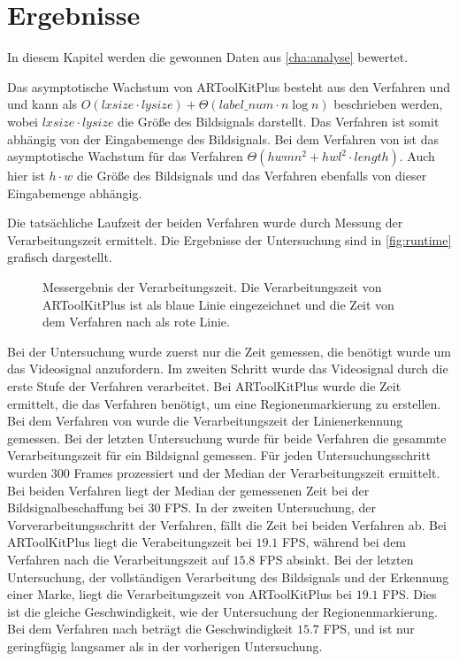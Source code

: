 \chapter{Ergebnisse} %
\label{cha:ergebnisse}
\begin{comment}
	Ergebnisse: Die gewonnen Daten aus Kap. Analyse bewerten.
\end{comment}

In diesem Kapitel werden die gewonnen Daten aus \autoref{cha:analyse} bewertet.

Das asymptotische Wachstum von ARToolKitPlus besteht aus den Verfahren  und
  und kann als $O(\mathit{lxsize}\cdot\mathit{lysize})
 + \Theta(\mathit{label\_num}\cdot n \log n)$ beschrieben werden, wobei $\mathit{lxsize}\cdot\mathit{lysize}$ die Größe
 des Bildsignals darstellt. Das Verfahren ist somit abhängig von der Eingabemenge des Bildsignals. Bei dem Verfahren von
 \citeauthor{hirzer08} ist das asymptotische Wachstum für das Verfahren 
 $\Theta(hwmn^2+hwl^2\cdot\mathit{length})$. Auch hier ist $h \cdot w$ die Größe des Bildsignals und das Verfahren
 ebenfalls von dieser Eingabemenge abhängig.

Die tatsächliche Laufzeit der beiden Verfahren wurde durch Messung der Verarbeitungszeit ermittelt. Die Ergebnisse der Untersuchung sind in \autoref{fig:runtime} grafisch dargestellt.
\begin{figure}[!ht]
	\centering
	
	\caption{Messergebnis der Verarbeitungszeit. Die Verarbeitungszeit von ARToolKitPlus ist als blaue Linie
	 eingezeichnet und die Zeit von dem Verfahren nach \citeauthor{hirzer08} als rote Linie.}
	\label{fig:runtime}
\end{figure}
 Bei der Untersuchung wurde zuerst nur die Zeit gemessen, die benötigt wurde um das Videosignal anzufordern. Im zweiten
 Schritt wurde das Videosignal durch die erste Stufe der Verfahren verarbeitet. Bei ARToolKitPlus wurde die Zeit
 ermittelt, die das Verfahren  benötigt, um eine Regionenmarkierung zu erstellen. Bei dem
 Verfahren von \citeauthor{hirzer08} wurde die Verarbeitungszeit der Linienerkennung gemessen. Bei der letzten
 Untersuchung wurde für beide Verfahren die gesammte Verarbeitungszeit für ein Bildsignal gemessen. Für jeden
 Untersuchungsschritt wurden $300$ Frames prozessiert und der Median der Verarbeitungszeit ermittelt. Bei beiden
 Verfahren liegt der Median der gemessenen Zeit bei der Bildsignalbeschaffung bei $30$ FPS. In der zweiten
 Untersuchung, der Vorverarbeitungsschritt der Verfahren, fällt die Zeit bei beiden Verfahren ab. Bei ARToolKitPlus
 liegt die Verabeitungszeit bei $19.1$ FPS, während bei dem Verfahren nach \citeauthor{hirzer08} die Verarbeitungszeit
 auf $15.8$ FPS absinkt. Bei der letzten Untersuchung, der vollständigen Verarbeitung des Bildsignals und der Erkennung
 einer Marke, liegt die Verarbeitungszeit von ARToolKitPlus bei $19.1$ FPS. Dies ist die gleiche Geschwindigkeit, wie
 der Untersuchung der Regionenmarkierung. Bei dem Verfahren nach \citeauthor{hirzer08} beträgt die Geschwindigkeit
 $15.7$ FPS, und ist nur geringfügig langsamer als in der vorherigen Untersuchung.

